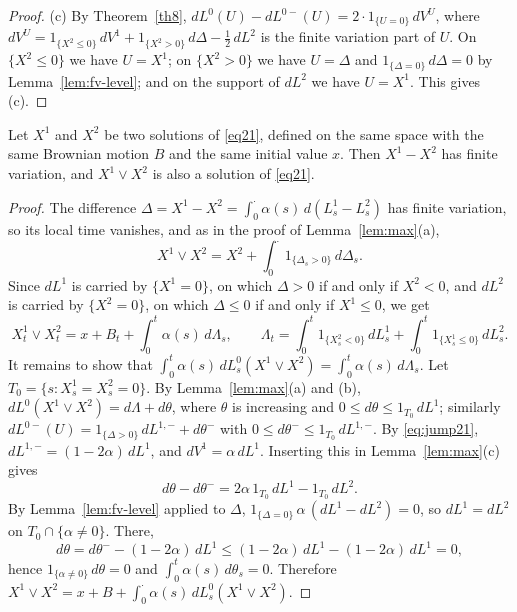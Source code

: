 \begin{proof}
	(c) By Theorem~\ref{th8}, $dL^0(U) - dL^{0-}(U) = 2\cdot 1_{\{U=0\}}\,dV^U$, where
	$dV^U = 1_{\{X^2\leqslant 0\}}\,dV^1 + 1_{\{X^2>0\}}\,d\Delta - \frac{1}{2}\,dL^2$ is the
	finite variation part of $U$. On $\{X^2\leqslant 0\}$ we have $U = X^1$; on
	$\{X^2 > 0\}$ we have $U = \Delta$ and $1_{\{\Delta = 0\}}\,d\Delta = 0$ by
	Lemma~\ref{lem:fv-level}; and on the support of $dL^2$ we have $U = X^1$. This gives (c).
\end{proof}

\begin{proposition}\label{pro:sup}
	Let $X^1$ and $X^2$ be two solutions of \eqref{eq21}, defined on the same
	space with the same Brownian motion $B$ and the same initial value $x$.
	Then $X^1 - X^2$ has finite variation, and $X^1\vee X^2$ is also a solution
	of \eqref{eq21}.
\end{proposition}

\begin{proof}
	The difference $\Delta = X^1 - X^2 = \int_0^\cdot \alpha(s)\,d(L^1_s - L^2_s)$ has
	finite variation, so its local time vanishes, and as in the proof of
	Lemma~\ref{lem:max}(a),
	\[
		X^1 \vee X^2 = X^2 + \int_0^\cdot 1_{\{\Delta_s > 0\}}\,d\Delta_s .
	\]
	Since $dL^1$ is carried by $\{X^1 = 0\}$, on which $\Delta > 0$ if and only if
	$X^2 < 0$, and $dL^2$ is carried by $\{X^2 = 0\}$, on which $\Delta\leqslant 0$ if
	and only if $X^1 \leqslant 0$, we get
	\[
		X^1_t \vee X^2_t = x + B_t + \int_0^t \alpha(s)\,d\Lambda_s,
		\qquad
		\Lambda_t = \int_0^t 1_{\{X^2_s < 0\}}\,dL^1_s + \int_0^t 1_{\{X^1_s \leqslant 0\}}\, dL^2_s .
	\]
	It remains to show that $\int_0^t \alpha(s)\,dL^0_s(X^1\vee X^2) = \int_0^t\alpha(s)\,d\Lambda_s$.
	Let $T_0 = \{s : X^1_s = X^2_s = 0\}$. By Lemma~\ref{lem:max}(a) and (b),
	$dL^0(X^1\vee X^2) = d\Lambda + d\theta$, where $\theta$ is increasing and
	$0\leqslant d\theta\leqslant 1_{T_0}\,dL^1$; similarly
	$dL^{0-}(U) = 1_{\{\Delta>0\}}\,dL^{1,-} + d\theta^-$ with
	$0\leqslant d\theta^- \leqslant 1_{T_0}\,dL^{1,-}$. By \eqref{eq:jump21},
	$dL^{1,-} = (1-2\alpha)\,dL^1$, and $dV^1 = \alpha\,dL^1$. Inserting this in
	Lemma~\ref{lem:max}(c) gives
	\[
		d\theta - d\theta^- = 2\alpha\, 1_{T_0}\,dL^1 - 1_{T_0}\,dL^2 .
	\]
	By Lemma~\ref{lem:fv-level} applied to $\Delta$,
	$1_{\{\Delta = 0\}}\,\alpha\,(dL^1 - dL^2) = 0$, so $dL^1 = dL^2$ on
	$T_0\cap\{\alpha\neq 0\}$. There,
	\[
		d\theta = d\theta^- - (1-2\alpha)\,dL^1 \leqslant (1-2\alpha)\,dL^1 - (1-2\alpha)\,dL^1 = 0 ,
	\]
	hence $1_{\{\alpha\neq 0\}}\,d\theta = 0$ and $\int_0^t \alpha(s)\,d\theta_s = 0$. Therefore
	$X^1\vee X^2 = x + B + \int_0^\cdot\alpha(s)\,dL^0_s(X^1\vee X^2)$.
\end{proof}

